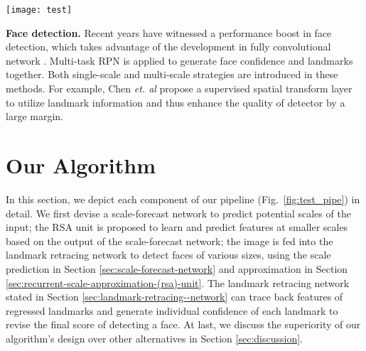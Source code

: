 \documentclass[10pt,twocolumn,letterpaper]{article}
\begin{document}
\begin{figure*}[t]
	\begin{center}
		\texttt{[image: test]}
	\end{center}
	\vspace{-.2cm}
	\caption{Pipeline of our proposed algorithm. (a) Given an image, we predict potential scales from the scale-forecast network and group the results in six main bins (). (b) RSA unit. The input is resized based on the smallest scale (corresponding to the largest feature map) and the feature maps at other scales are predicted directly from the unit. 
		(c)
		 Given predicted maps, LRN performs landmark detection in an RPN manner. The landmarks can \textit{trace back} locations via regression to generate individual confidence regarding the existence of the landmark. 
(d) Due to the retracing mechanism, the final score of detecting a face 
		is revised by the confidence of landmarks,
		which can effectively dispose of false positives.
	}
	\label{fig:test_pipe}
	\vspace{-.4cm}
\end{figure*}



\textbf{Face detection.} Recent years have witnessed a  performance boost in  face detection, which takes 
 advantage of the development in fully convolutional network \cite{farfade2015multi,li2016face,yu2016unitbox,yang2015convolutional}.
Multi-task RPN is applied \cite{chen2016supervised,ranjan2016hyperface,sun2017face,hao2017scale} to generate face confidence and landmarks together. Both single-scale and multi-scale strategies are introduced in these methods.
For example, Chen \textit{et. al} \cite{chen2016supervised} propose a supervised spatial transform layer to utilize landmark information and thus enhance the quality of detector by a large margin.  



\section{Our Algorithm}\label{sec:our-algorithm}
In this section, we depict each component of our pipeline (Fig.~\ref{fig:test_pipe}) in detail. 
We first devise a scale-forecast network to predict potential scales of the input; 
the RSA unit is proposed to learn and predict  features at smaller scales  based on the output of the scale-forecast network;
the image is fed into the landmark retracing network to detect faces of various sizes, using the scale prediction in Section \ref{sec:scale-forecast-network} and approximation in Section \ref{sec:recurrent-scale-approximation-(rsa)-unit}. 
The landmark retracing network stated in Section \ref{sec:landmark-retracing--network} can trace back features of regressed landmarks and generate individual confidence of each landmark to revise the final score of detecting a face. 
At last, we discuss the superiority of our algorithm's design over other alternatives
in Section \ref{sec:discussion}.
\end{document}
